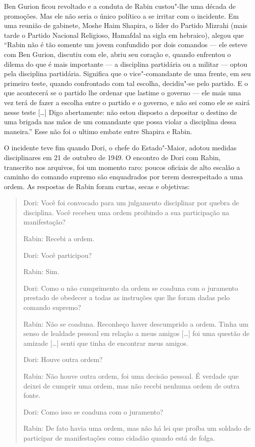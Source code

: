 Ben Gurion ficou revoltado e a conduta de Rabin custou"-lhe uma década de
promoções. Mas ele não seria o único político a se irritar com o
incidente. Em uma reunião de gabinete, Moshe Haim Shapira, o líder do Partido Mizrahi (mais
tarde o Partido Nacional Religioso, Hamafdal na sigla em hebraico), alegou que
``Rabin não é tão somente um jovem confundido por dois comandos --- ele
esteve com Ben Gurion, discutiu com ele, abriu seu coração e, quando
enfrentou o dilema do que é mais importante --- a disciplina partidária
ou a militar --- optou pela disciplina partidária. Significa que o vice"-comandante
de uma frente, em seu primeiro teste, quando confrontado
com tal escolha, decidiu"-se pelo partido. E o que acontecerá se o
partido lhe ordenar que lastime o governo --- ele mais uma vez terá de
fazer a escolha entre o partido e o governo, e não sei como ele se sairá
nesse teste {[}\ldots{}{]} Digo abertamente: não estou disposto a depositar o
destino de uma brigada nas mãos de um comandante que possa violar a
disciplina dessa maneira.'' Esse não foi o ultimo embate entre Shapira e
Rabin.

O incidente teve fim quando Dori, o chefe do Estado"-Maior, adotou medidas
disciplinares em 21 de outubro de 1949. O encontro de Dori com Rabin,
transcrito nos arquivos, foi um momento raro: poucos oficiais de alto
escalão a caminho do comando supremo são enquadrados por terem
desrespeitado a uma ordem. As respostas de Rabin foram curtas, secas e
objetivas:

\begin{quote}
Dori: Você foi convocado para um julgamento disciplinar por quebra de
disciplina. Você recebeu uma ordem proibindo a sua participação na
manifestação?

Rabin: Recebi a ordem.

Dori: Você participou?

Rabin: Sim.

Dori: Como o não cumprimento da ordem se coaduna com o juramento
prestado de obedecer a todas as instruções que lhe foram dadas pelo
comando supremo?

Rabin: Não se coaduna. Reconheço haver descumprido a ordem. Tinha um
senso de lealdade pessoal em relação a meus amigos {[}\ldots{}{]} foi uma questão de
amizade {[}\ldots{}{]} senti que tinha de encontrar meus amigos.

Dori: Houve outra ordem?

Rabin: Não houve outra ordem, foi uma decisão pessoal. É verdade que
deixei de cumprir uma ordem, mas não recebi nenhuma ordem de outra
fonte.

Dori: Como isso se coaduna com o juramento?

Rabin: De fato havia uma ordem, mas não há lei que proíba um
soldado de participar de manifestações como cidadão quando está de folga.
\end{quote}

